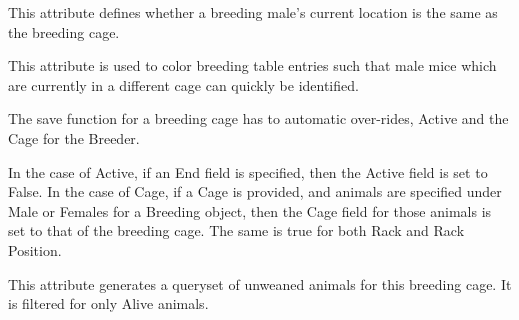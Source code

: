 \documentclass[letterpaper,10pt,english]{sphinxmanual}
\begin{document}
\begin{fulllineitems}

\begin{fulllineitems}
\label{api:mousedb.animal.models.Breeding.get_genotype_display}
\end{fulllineitems}



\begin{fulllineitems}
\label{api:mousedb.animal.models.Breeding.male_breeding_location_type}
This attribute defines whether a breeding male's current location is the same as the breeding cage.

This attribute is used to color breeding table entries such that male mice which are currently in a different cage can quickly be identified.

\end{fulllineitems}



\begin{fulllineitems}
\label{api:mousedb.animal.models.Breeding.plugevents_set}
\end{fulllineitems}



\begin{fulllineitems}
\label{api:mousedb.animal.models.Breeding.save}
The save function for a breeding cage has to automatic over-rides, Active and the Cage for the Breeder.

In the case of Active, if an End field is specified, then the Active field is set to False.
In the case of Cage, if a Cage is provided, and animals are specified under Male or Females for a Breeding object, then the Cage field for those animals is set to that of the breeding cage.  The same is true for both Rack and Rack Position.

\end{fulllineitems}



\begin{fulllineitems}
\label{api:mousedb.animal.models.Breeding.unweaned}
This attribute generates a queryset of unweaned animals for this breeding cage.  It is filtered for only Alive animals.

\end{fulllineitems}


\end{fulllineitems}
\end{document}
